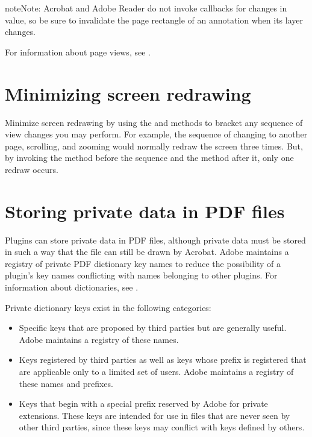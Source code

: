 \documentclass[letterpaper,12pt,english,openany,oneside]{sphinxmanual}
\begin{document}
\begin{sphinxadmonition}{note}{Note:}
Acrobat and Adobe Reader do not invoke  callbacks for changes in value, so be sure to invalidate the page rectangle of an annotation when its layer changes.
\end{sphinxadmonition}

For information about page views, see .


\section{Minimizing screen redrawing}
\label{\detokenize{Plugins_Pimech:minimizing-screen-redrawing}}
Minimize screen redrawing by using the  and  methods to bracket any sequence of view changes you may perform. For example, the sequence of changing to another page, scrolling, and zooming would normally redraw the screen three times. But, by invoking the  method before the sequence and the  method after it, only one redraw occurs.


\section{Storing private data in PDF files}
\label{\detokenize{Plugins_Pimech:storing-private-data-in-pdf-files}}
Plugins can store private data in PDF files, although private data must be stored in such a way that the file can still be drawn by Acrobat. Adobe maintains a registry of private PDF dictionary key names to reduce the possibility of a plugin’s key names conflicting with names belonging to other plugins. For information about dictionaries, see .

Private dictionary keys exist in the following categories:
\begin{itemize}
\item {} 
Specific keys that are proposed by third parties but are generally useful. Adobe maintains a registry of these names.

\item {} 
Keys registered by third parties as well as keys whose prefix is registered that are applicable only to a limited set of users. Adobe maintains a registry of these names and prefixes.

\item {} 
Keys that begin with a special prefix reserved by Adobe for private extensions. These keys are intended for use in files that are never seen by other third parties, since these keys may conflict with keys defined by others.

\end{itemize}
\end{document}
